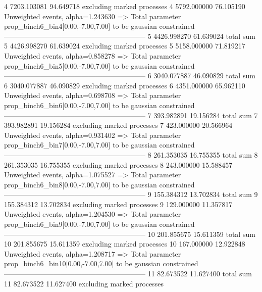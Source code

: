 4          7203.103081     94.649718       excluding marked processes    
4          5792.000000     76.105190       Unweighted events, alpha=1.243630
  => Total parameter prop_binch6_bin4[0.00,-7.00,7.00] to be gaussian constrained
------------------------------------------------------------
5          4426.998270     61.639024       total sum                     
5          4426.998270     61.639024       excluding marked processes    
5          5158.000000     71.819217       Unweighted events, alpha=0.858278
  => Total parameter prop_binch6_bin5[0.00,-7.00,7.00] to be gaussian constrained
------------------------------------------------------------
6          3040.077887     46.090829       total sum                     
6          3040.077887     46.090829       excluding marked processes    
6          4351.000000     65.962110       Unweighted events, alpha=0.698708
  => Total parameter prop_binch6_bin6[0.00,-7.00,7.00] to be gaussian constrained
------------------------------------------------------------
7          393.982891      19.156284       total sum                     
7          393.982891      19.156284       excluding marked processes    
7          423.000000      20.566964       Unweighted events, alpha=0.931402
  => Total parameter prop_binch6_bin7[0.00,-7.00,7.00] to be gaussian constrained
------------------------------------------------------------
8          261.353035      16.755355       total sum                     
8          261.353035      16.755355       excluding marked processes    
8          243.000000      15.588457       Unweighted events, alpha=1.075527
  => Total parameter prop_binch6_bin8[0.00,-7.00,7.00] to be gaussian constrained
------------------------------------------------------------
9          155.384312      13.702834       total sum                     
9          155.384312      13.702834       excluding marked processes    
9          129.000000      11.357817       Unweighted events, alpha=1.204530
  => Total parameter prop_binch6_bin9[0.00,-7.00,7.00] to be gaussian constrained
------------------------------------------------------------
10         201.855675      15.611359       total sum                     
10         201.855675      15.611359       excluding marked processes    
10         167.000000      12.922848       Unweighted events, alpha=1.208717
  => Total parameter prop_binch6_bin10[0.00,-7.00,7.00] to be gaussian constrained
------------------------------------------------------------
11         82.673522       11.627400       total sum                     
11         82.673522       11.627400       excluding marked processes    
